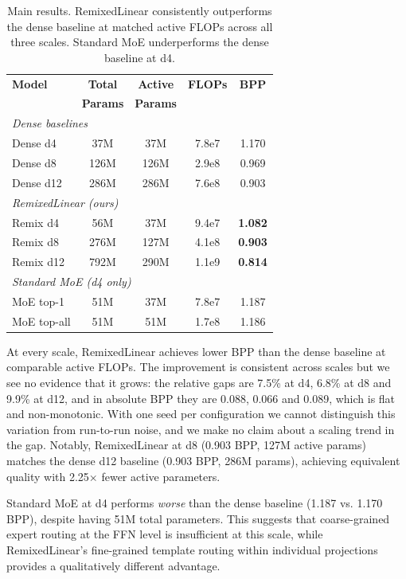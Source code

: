 \documentclass{article}
\begin{document}
\begin{table}[t]
\centering
\small
\caption{Main results. RemixedLinear consistently outperforms the dense baseline at matched active FLOPs across all three scales. Standard MoE underperforms the dense baseline at d4.}
\label{tab:main}
\begin{tabular}{@{}lcccc@{}}
\toprule
\textbf{Model} & \textbf{Total} & \textbf{Active} & \textbf{FLOPs} & \textbf{BPP} \\
& \textbf{Params} & \textbf{Params} & & \\
\midrule
\multicolumn{5}{l}{\textit{Dense baselines}} \\
\quad Dense d4 & 37M & 37M & 7.8e7 & 1.170 \\
\quad Dense d8 & 126M & 126M & 2.9e8 & 0.969 \\
\quad Dense d12 & 286M & 286M & 7.6e8 & 0.903 \\
\midrule
\multicolumn{5}{l}{\textit{RemixedLinear (ours)}} \\
\quad Remix d4 & 56M & 37M & 9.4e7 & \textbf{1.082} \\
\quad Remix d8 & 276M & 127M & 4.1e8 & \textbf{0.903} \\
\quad Remix d12 & 792M & 290M & 1.1e9 & \textbf{0.814} \\
\midrule
\multicolumn{5}{l}{\textit{Standard MoE (d4 only)}} \\
\quad MoE top-1 & 51M & 37M & 7.8e7 & 1.187 \\
\quad MoE top-all & 51M & 51M & 1.7e8 & 1.186 \\
\bottomrule
\end{tabular}
\end{table}

At every scale, RemixedLinear achieves lower BPP than the dense baseline at comparable active FLOPs. The improvement is consistent across scales but we see no evidence that it grows: the relative gaps are 7.5\% at d4, 6.8\% at d8 and 9.9\% at d12, and in absolute BPP they are 0.088, 0.066 and 0.089, which is flat and non-monotonic. With one seed per configuration we cannot distinguish this variation from run-to-run noise, and we make no claim about a scaling trend in the gap. Notably, RemixedLinear at d8 (0.903 BPP, 127M active params) matches the dense d12 baseline (0.903 BPP, 286M params), achieving equivalent quality with 2.25$\times$ fewer active parameters.

Standard MoE at d4 performs \emph{worse} than the dense baseline (1.187 vs. 1.170 BPP), despite having 51M total parameters. This suggests that coarse-grained expert routing at the FFN level is insufficient at this scale, while RemixedLinear's fine-grained template routing within individual projections provides a qualitatively different advantage.
\end{document}
